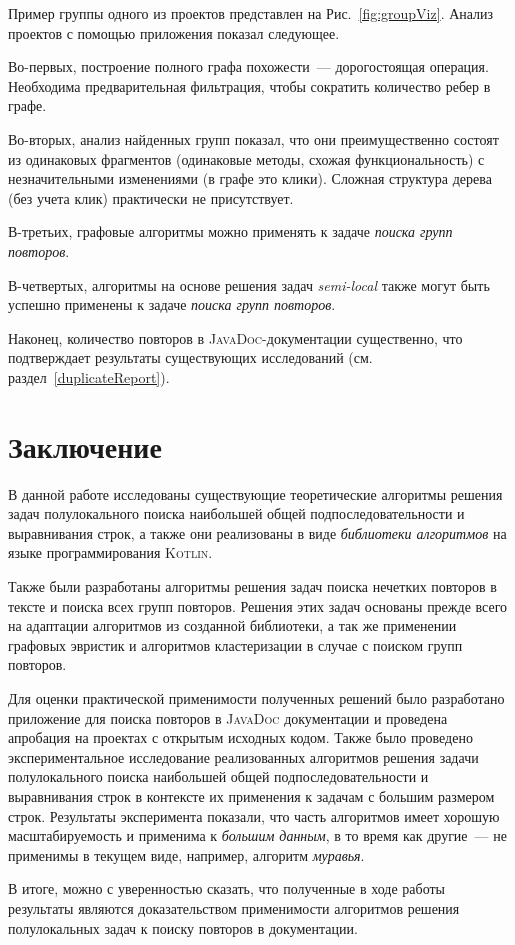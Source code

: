 Пример группы одного из проектов представлен на Рис.~\ref{fig:groupViz}.
Анализ проектов с помощью приложения показал следующее.

Во-первых, построение полного графа похожести~--- дорогостоящая операция.
Необходима предварительная фильтрация, чтобы сократить количество ребер в графе. 

Во-вторых, анализ найденных групп показал, что они преимущественно состоят из одинаковых фрагментов (одинаковые методы, схожая функциональность) с незначительными изменениями (в графе это клики).
Сложная структура дерева (без учета клик) практически не присутствует.

В-третьих, графовые алгоритмы можно применять к задаче \emph{поиска групп повторов}.

В-четвертых, алгоритмы на основе решения задач \emph{semi-local} также могут быть успешно применены к задаче \emph{поиска групп повторов}.

Наконец, количество повторов в \textsc{JavaDoc}-документации существенно, что подтверждает результаты существующих исследований (см. раздел~\ref{duplicateReport}).

\section*{Заключение}

В данной работе исследованы существующие теоретические алгоритмы решения задач полулокального поиска наибольшей общей подпоследовательности и выравнивания строк, а также они реализованы в виде \emph{библиотеки алгоритмов} на языке программирования \textsc{Kotlin}.

Также были разработаны алгоритмы решения задач поиска нечетких повторов в тексте и поиска всех групп повторов.
Решения этих задач основаны прежде всего на адаптации алгоритмов из созданной библиотеки, а так же применении графовых эвристик и алгоритмов кластеризации в случае с поиском групп повторов. 

Для оценки практической применимости полученных решений было разработано приложение для поиска повторов в \textsc{JavaDoc} документации и проведена апробация на проектах с открытым исходных кодом.
Также было проведено экспериментальное исследование реализованных алгоритмов решения задачи полулокального поиска наибольшей общей подпоследовательности и выравнивания строк в контексте их применения к задачам с большим размером строк.
Результаты эксперимента показали, что часть алгоритмов имеет хорошую масштабируемость и применима к \emph{большим данным}, в то время как другие~--- не применимы в текущем виде, например, алгоритм \emph{муравья}. 

В итоге, можно с уверенностью сказать, что полученные в ходе работы результаты являются доказательством применимости алгоритмов решения полулокальных задач к поиску повторов в документации.





